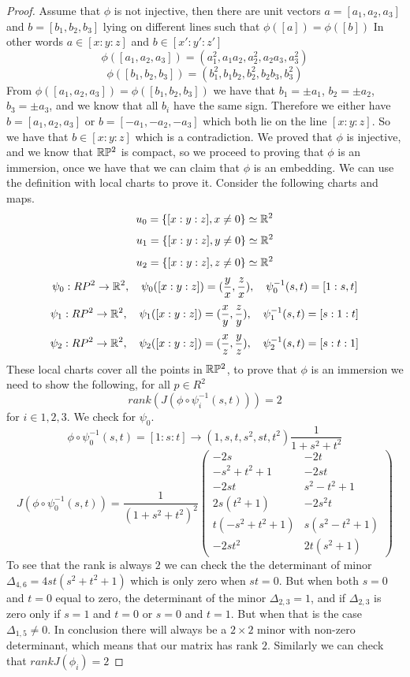 \documentclass[11pt,a4paper]{report}
\begin{document}
\begin{proof}
\noindent Assume that $\phi$ is not injective, then there are unit vectors $a = [a_1,a_2,a_3]$ and $b=[b_1,b_2,b_3]$ lying on different lines 
such that $\phi([a]) = \phi([b])$ 
In other words $a \in [x:y:z]$  and $b \in [x ':y ':z ']$
$$\phi([a_1,a_2,a_3]) = (a_1^2, a_1a_2, a_2^2, a_2a_3, a_3^2)$$
$$\phi([b_1,b_2,b_3]) = (b_1^2, b_1b_2, b_2^2, b_2b_3, b_3^2)$$
From $\phi([a_1,a_2,a_3]) = \phi([b_1,b_2,b_3])$ we have that $b_1 = \pm a_1$, $b_2 = \pm a_2$, $b_3 = \pm a_3$, and we know that all $b_i$ have the same sign.
Therefore  we either have $b = [a_1, a_2, a_3]$ or $b = [-a_1, -a_2,-a_3]$ which both lie on the line $[x:y:z]$. So we have that $b \in [x:y:z]$ which is a contradiction.
\newline
We proved that $\phi$ is injective, and we know that $\mathbb{R} \mathbb{P} ^2$ is compact, so we proceed to proving that $\phi$ is an immersion, 
once we have that we can claim that $\phi$ is an embedding.
\newline
\noindent We can use the definition with local charts to prove it. 
Consider the following charts and maps.
$$ u_0 =  \{ [x:y:z], x \neq 0 \} \simeq \mathbb{R}^2  $$
$$ u_1 =  \{ [x:y:z], y \neq 0 \} \simeq \mathbb{R}^2  $$
$$ u_2 = \{ [x:y:z], z \neq 0 \} \simeq \mathbb{R}^2  $$
$$ \psi_0: RP^2 \to \mathbb{R}^2, \quad
\psi_0([x:y:z]) = (\frac{y}{x}, \frac{z}{x}), \quad
\psi_0^{-1}(s,t) = [1:s,t]
$$
$$ \psi_1: RP^2 \to \mathbb{R}^2, \quad
\psi_1([x:y:z]) = (\frac{x}{y}, \frac{z}{y}), \quad
\psi_1^{-1}(s,t) = [s:1:t]
$$
$$ \psi_2: RP^2 \to \mathbb{R}^2, \quad
\psi_2([x:y:z]) = (\frac{x}{z}, \frac{y}{z}), \quad
\psi_2^{-1}(s,t) = [s:t:1]
$$
These local charts cover all the points in $\mathbb{R} \mathbb{P} ^2$, to prove that $\phi$ is an immersion
we need to show the following, for all $p \in R^2$
$$ rank(J(\phi \circ \psi_i^{-1}(s,t))) = 2 $$
for $i \in {1,2,3}$.
\newline
We check for $\psi_0$.
$$\phi \circ \psi_0^{-1}(s,t) = [1:s:t] \to (1,s,t,s^2,st,t^2) \frac{1}{1+s^2+t^2} $$
$$ J(\phi \circ \psi_0^{-1}(s,t)) = \frac{1}{(1+s^2+t^2)^2} 
\begin{pmatrix}
-2s & -2t \\
-s^2+t^2+1 & -2st \\
-2st & s^2-t^2+1 \\
2s (t^2+1) & -2 s^2 t \\
t (-s^2 + t^2 +1 ) & s (s^2 - t^2 + 1) \\
-2st^2 & 2t(s^2+1)
\end{pmatrix} 
$$
To see that the rank is always $2$ we can check the the determinant of minor  $\Delta_{4,6} = 4 s t (s^2 + t^2 + 1)$ which is only zero when $st=0$.
But when both $s =0$ and  $t=0$ equal to zero, the determinant of the minor $\Delta_{2,3} = 1$, and if $\Delta_{2,3}$ is zero only if $s=1$ and $t=0$ or $s=0$ and $t=1$. 
But when that is the case $\Delta_{1,5} \neq 0 $. In conclusion there will always be a $2 \times 2$ minor with non-zero determinant, which means that our matrix has rank $2$.
Similarly we can check that $rank J(\phi_i) = 2$
\end{proof}
\end{document}
